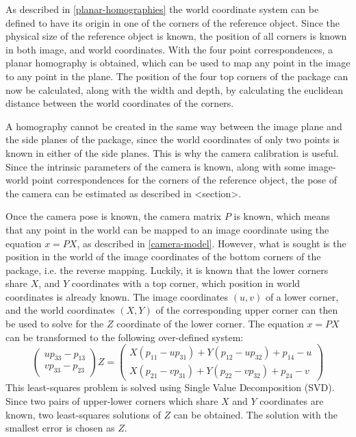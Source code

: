 As described in \ref{planar-homographies} the world coordinate system can be defined to have its origin in one of the corners of the reference object.
Since the physical size of the reference object is known, the position of all corners is known in both image, and world coordinates.
With the four point correspondences, a planar homography is obtained, which can be used to map any point in the image to any point in the plane.
The position of the four top corners of the package can now be calculated, along with the width and depth, by calculating the euclidean distance between the world coordinates of the corners.

A homography cannot be created in the same way between the image plane and the side planes of the package, since the world coordinates of only two points is known in either of the side planes.
This is why the camera calibration is useful. 
Since the intrinsic parameters of the camera is known, along with some image-world point correspondences for the corners of the reference object, the pose of the camera can be estimated as described in <section>. %

Once the camera pose is known, the camera matrix $P$ is known, which means that any point in the world can be mapped to an image coordinate using the equation $x=PX$, as described in \ref{camera-model}.
However, what is sought is the position in the world of the image coordinates of the bottom corners of the package, i.e. the reverse mapping.
Luckily, it is known that the lower corners share $X$, and $Y$ coordinates with a top corner, which position in world coordinates is already known.
The image coordinates $(u,v)$ of a lower corner, and the world coordinates $(X,Y)$ of the corresponding upper corner can then be used to solve for the $Z$ coordinate of the lower corner. 
The equation $x=PX$ can be transformed to the following over-defined system:
$$
\begin{pmatrix} up_{33}-p_{13} \\ vp_{33}-p_{23} \end{pmatrix} Z = 
\begin{pmatrix}
X(p_{11}-up_{31}) + Y(p_{12}-up_{32})+p_{14}-u \\
X(p_{21}-vp_{31}) + Y(p_{22}-vp_{32})+p_{24}-v
\end{pmatrix}
$$
This least-squares problem is solved using Single Value Decomposition (SVD).
Since two pairs of upper-lower corners which share $X$ and $Y$ coordinates are known, two least-squares solutions of $Z$ can be obtained.
The solution with the smallest error is chosen as $Z$.

